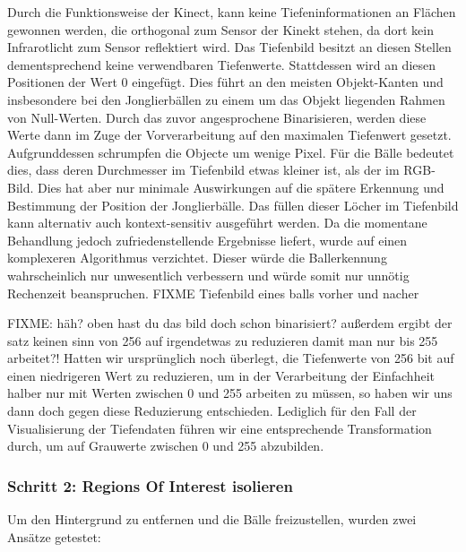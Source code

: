 \documentclass[12pt,a4paper,ngerman]{scrartcl}
\begin{document}
Durch die Funktionsweise der Kinect, kann keine Tiefeninformationen an Flächen gewonnen werden, die orthogonal zum Sensor der Kinekt stehen, da dort kein Infrarotlicht zum Sensor reflektiert wird.
Das Tiefenbild besitzt an diesen Stellen dementsprechend keine verwendbaren Tiefenwerte. Stattdessen wird an diesen Positionen der Wert 0 eingefügt. Dies führt an den meisten Objekt-Kanten und insbesondere bei den Jonglierbällen zu einem um das Objekt liegenden Rahmen von Null-Werten. Durch das zuvor angesprochene Binarisieren, werden diese Werte dann im Zuge der Vorverarbeitung auf den maximalen Tiefenwert gesetzt. Aufgrunddessen schrumpfen die Objecte um wenige Pixel. Für die Bälle bedeutet dies, dass deren Durchmesser im Tiefenbild etwas kleiner ist, als der im RGB-Bild. Dies hat aber nur minimale Auswirkungen auf die spätere Erkennung und Bestimmung der Position der Jonglierbälle.
Das füllen dieser Löcher im Tiefenbild kann alternativ auch kontext-sensitiv ausgeführt werden. Da die momentane Behandlung jedoch zufriedenstellende Ergebnisse liefert, wurde auf einen komplexeren Algorithmus verzichtet. Dieser würde die Ballerkennung wahrscheinlich nur unwesentlich verbessern und würde somit nur unnötig Rechenzeit beanspruchen.
{\color{red}FIXME Tiefenbild eines balls vorher und nacher}

{\color{red}FIXME: häh? oben hast du das bild doch schon binarisiert? außerdem ergibt der satz keinen sinn von 256 auf irgendetwas zu reduzieren damit man nur bis 255 arbeitet?! }
Hatten wir ursprünglich noch überlegt, die Tiefenwerte von 256 bit auf einen
niedrigeren Wert zu reduzieren, um in der Verarbeitung der Einfachheit halber nur
mit Werten zwischen 0 und 255 arbeiten zu müssen, so haben wir uns dann doch gegen
diese Reduzierung entschieden. Lediglich für den Fall der Visualisierung der
Tiefendaten führen wir eine entsprechende Transformation durch, um auf Grauwerte
zwischen 0 und 255 abzubilden.

\subsubsection{Schritt 2: Regions Of Interest isolieren}
\label{sec:roi}

Um den Hintergrund zu entfernen und die Bälle freizustellen, wurden zwei Ansätze getestet:
\end{document}

